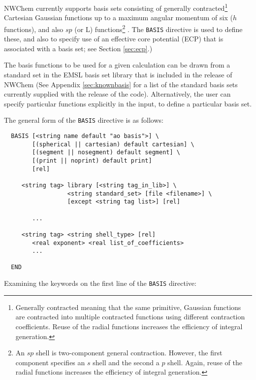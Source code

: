 \label{sec:basis} 

NWChem currently supports basis sets consisting of generally
contracted\footnote{Generally contracted meaning that the same
  primitive, Gaussian functions are contracted into multiple
  contracted functions using different contraction coefficients.
  Reuse of the radial functions increases the efficiency of integral
  generation.} Cartesian Gaussian functions up to a maximum angular
momentum of six ($h$ functions), and also $sp$ (or L)
functions\footnote{An $sp$ shell is two-component general contraction.
  However, the first component specifies an $s$ shell and the second a
  $p$ shell.  Again, reuse of the radial functions increases the efficiency
  of integral generation.} .  The {\tt BASIS} directive is used to
define these, and also to specify use of an effective core potential
(ECP) that is associated with a basis set; see Section \ref{sec:ecp}.)

The basis functions to be used for a given calculation can be drawn
from a standard set in the EMSL basis set library that is included in
the release of NWChem  (See Appendix \ref{sec:knownbasis} for a list
of the standard basis sets currently supplied with the release of the
code).  Alternatively, the user can specify particular functions
explicitly in the input, to define a particular basis set.

The general form of the \verb+BASIS+ directive is as follows:

\begin{verbatim}
  BASIS [<string name default "ao basis">] \
        [(spherical || cartesian) default cartesian] \
        [(segment || nosegment) default segment] \
        [(print || noprint) default print]
        [rel]

     <string tag> library [<string tag_in_lib>] \
                  <string standard_set> [file <filename>] \
                  [except <string tag list>] [rel]

        ...

     <string tag> <string shell_type> [rel]
        <real exponent> <real list_of_coefficients>
        ...
     
  END
\end{verbatim}    

Examining the keywords on the first line of the \verb+BASIS+ directive:


